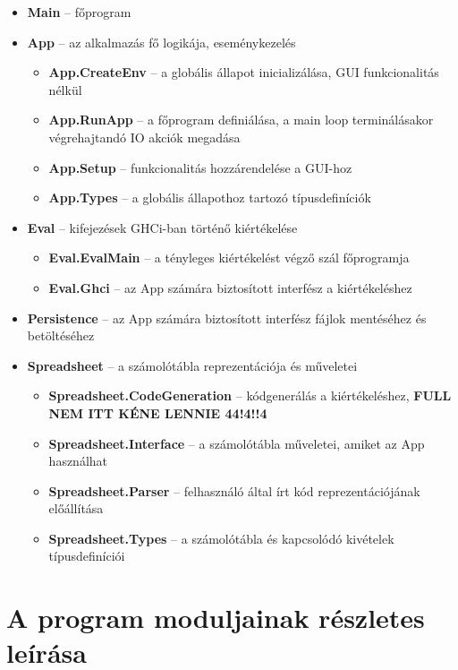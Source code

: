 \begin{itemize}
	\item \textbf{Main} -- főprogram
	\item \textbf{App} -- az alkalmazás fő logikája, eseménykezelés
	\begin{itemize}
		\item \textbf{App.CreateEnv} -- a globális állapot inicializálása, GUI funkcionalitás nélkül
		\item \textbf{App.RunApp} -- a főprogram definiálása, a main loop terminálásakor végrehajtandó IO akciók megadása
		\item \textbf{App.Setup}	-- funkcionalitás hozzárendelése a GUI-hoz
		\item \textbf{App.Types} -- a globális állapothoz tartozó típusdefiníciók
	\end{itemize}
	\item \textbf{Eval} -- kifejezések GHCi-ban történő kiértékelése
	\begin{itemize}
		\item \textbf{Eval.EvalMain} -- a tényleges kiértékelést végző szál főprogramja
		\item \textbf{Eval.Ghci} -- az App számára biztosított interfész a kiértékeléshez
	\end{itemize}
	\item \textbf{Persistence} -- az App számára biztosított interfész fájlok mentéséhez és betöltéséhez
	\item \textbf{Spreadsheet} -- a számolótábla reprezentációja és műveletei
	\begin{itemize}
		\item \textbf{Spreadsheet.CodeGeneration} -- kódgenerálás a kiértékeléshez, \textbf{FULL NEM ITT KÉNE LENNIE 44!4!!4}
		\item \textbf{Spreadsheet.Interface} -- a számolótábla műveletei, amiket az App használhat
		\item \textbf{Spreadsheet.Parser} -- felhasználó által írt kód reprezentációjának előállítása
		\item \textbf{Spreadsheet.Types} -- a számolótábla és kapcsolódó kivételek típusdefiníciói
	\end{itemize}
\end{itemize} 

\section{A program moduljainak részletes leírása}

